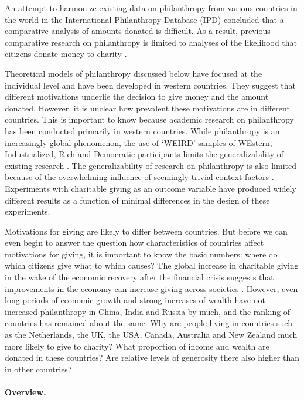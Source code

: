 \documentclass[twocolumn, serif, rga, numeric]{jote-article}
\begin{document}
An attempt to harmonize existing data on philanthropy from various countries in the world in the International Philanthropy Database (IPD) \cite{Wiepking2015} concluded that a comparative analysis of amounts donated is difficult. As a result, previous comparative research on philanthropy is limited to analyses of the likelihood that citizens donate money to charity \cite{Bekkers2016}.

Theoretical models of philanthropy discussed below have focused at the individual level and have been developed in western countries. They suggest that different motivations underlie the decision to give money and the amount donated. However, it is unclear how prevalent these motivations are in different countries. This is important to know because academic research on philanthropy has been conducted primarily in western countries. While philanthropy is an increasingly global phenomenon, the use of `WEIRD' samples of WEstern, Industrialized, Rich and Democratic participants limits the generalizability of existing research \cite{Henrich2010}. The generalizability of research on philanthropy is also limited because of the overwhelming influence of seemingly trivial context factors \cite{Guala2010, Tammi2013}.
Experiments with charitable giving as an outcome variable have produced widely different results as a function of minimal differences in the design of these experiments.

Motivations for giving are likely to differ between countries. But before we can even begin to answer the question how characteristics of countries affect motivations for giving, it is important to know the basic numbers: where do which citizens give what to which causes? 
The global increase in charitable giving in the wake of the economic recovery after the financial crisis suggests that improvements in the economy can increase giving across societies \cite{Bekkers2015b}.
However, even long periods of economic growth and strong increases of wealth have not increased philanthropy in China, India and Russia by much, and the ranking of countries has remained about the same. Why are people living in countries such as the Netherlands, the UK, the USA, Canada, Australia and New Zealand much more likely to give to charity? What proportion of income and wealth are donated in these countries? Are relative levels of generosity there also higher than in other countries? 
 {}\paragraph{Overview.} 
\end{document}
